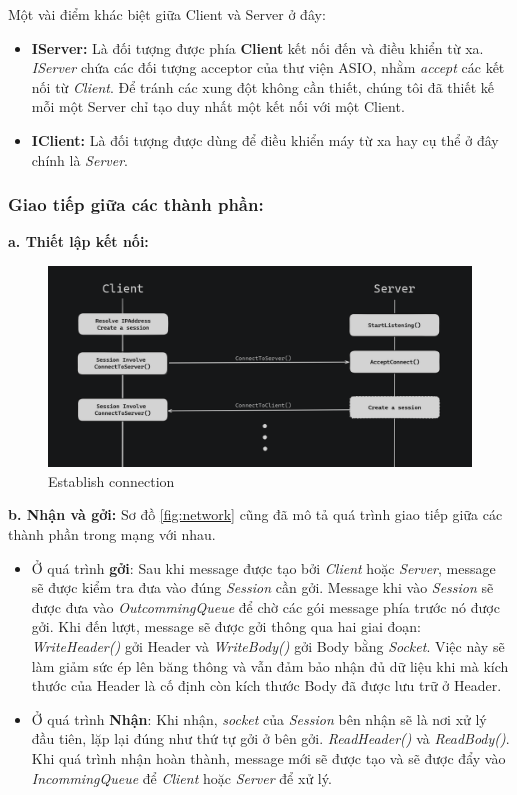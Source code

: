 Một vài điểm khác biệt giữa Client và Server ở đây: 
\begin{itemize}
	\item \textbf{IServer: } Là đối tượng được phía \textbf{Client} kết nối đến và điều khiển từ xa. \textit{IServer} chứa các đối tượng acceptor của thư viện ASIO, nhằm \textit{accept} các kết nối từ \textit{Client}. Để tránh các xung đột không cần thiết, chúng tôi đã thiết kế mỗi một Server chỉ tạo duy nhất một kết nối với một Client.
	\item \textbf{IClient: } Là đối tượng được dùng để điều khiển máy từ xa hay cụ thể ở đây chính là \textit{Server}. 
\end{itemize}

\subsubsection{Giao tiếp giữa các thành phần: }

\textbf{a. Thiết lập kết nối:}
\begin{figure}[H]
	\centering
	\includegraphics[width=\linewidth]{latex/architechture/connecting}
	\caption{Establish connection}
	\label{fig:handshake}
\end{figure}

\textbf{b. Nhận và gởi: }
Sơ đồ \ref{fig:network} cũng đã mô tả quá trình giao tiếp giữa các thành phần trong mạng với nhau. 
\begin{itemize}
	\item Ở quá trình \textbf{gởi}: Sau khi message được tạo bởi \textit{Client} hoặc \textit{Server}, message sẽ được kiểm tra đưa vào đúng \textit{Session} cần gởi. Message khi vào \textit{Session} sẽ được đưa vào \textit{OutcommingQueue} để chờ các gói message phía trước nó được gởi. Khi đến lượt, message sẽ được gởi thông qua hai giai đoạn: \textit{WriteHeader()} gởi Header và \textit{WriteBody()} gởi Body bằng \textit{Socket}. Việc này sẽ làm giảm sức ép lên băng thông và vẫn đảm bảo nhận đủ dữ liệu khi mà kích thước của Header là cố định còn kích thước Body đã được lưu trữ ở Header.
	\item Ở quá trình \textbf{Nhận}: Khi nhận, \textit{socket} của \textit{Session} bên nhận sẽ là nơi xử lý đầu tiên, lặp lại đúng như thứ tự gởi ở bên gởi. \textit{ReadHeader()} và \textit{ReadBody()}. Khi quá trình nhận hoàn thành, message mới sẽ được tạo và sẽ được đẩy vào \textit{IncommingQueue} để \textit{Client} hoặc \textit{Server} để xử lý.
\end{itemize}

